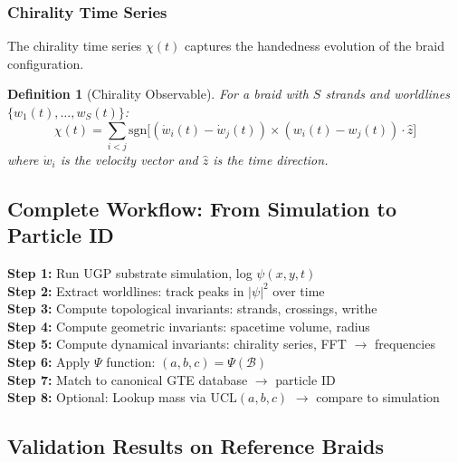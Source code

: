 \documentclass[11pt]{article}
\newtheorem{definition}[theorem]{Definition}
\theoremstyle{remark}
\begin{document}
\subsubsection{Chirality Time Series}

The chirality time series $\chi(t)$ captures the handedness evolution of the braid configuration.

\begin{definition}[Chirality Observable]
For a braid with $S$ strands and worldlines $\{w_1(t), \ldots, w_S(t)\}$:
\begin{equation}
\chi(t) = \sum_{i<j} \text{sgn}\big[(\dot{w}_i(t) - \dot{w}_j(t)) \times (w_i(t) - w_j(t)) \cdot \hat{z}\big]
\end{equation}
where $\dot{w}_i$ is the velocity vector and $\hat{z}$ is the time direction.
\end{definition}

\subsection{Complete Workflow: From Simulation to Particle ID}

\begin{tcolorbox}[colback=blue!5,colframe=blue!75!black,title=\textbf{Braid $\to$ GTE $\to$ Particle ID Pipeline}]
\textbf{Step 1:} Run UGP substrate simulation, log $\psi(x,y,t)$ \\
\textbf{Step 2:} Extract worldlines: track peaks in $|\psi|^2$ over time \\
\textbf{Step 3:} Compute topological invariants: strands, crossings, writhe \\
\textbf{Step 4:} Compute geometric invariants: spacetime volume, radius \\
\textbf{Step 5:} Compute dynamical invariants: chirality series, FFT $\to$ frequencies \\
\textbf{Step 6:} Apply $\Psi$ function: $(a, b, c) = \Psi(\mathcal{B})$ \\
\textbf{Step 7:} Match to canonical GTE database $\to$ particle ID \\
\textbf{Step 8:} Optional: Lookup mass via $\text{UCL}(a,b,c)$ $\to$ compare to simulation
\end{tcolorbox}

\subsection{Validation Results on Reference Braids}
\end{document}
